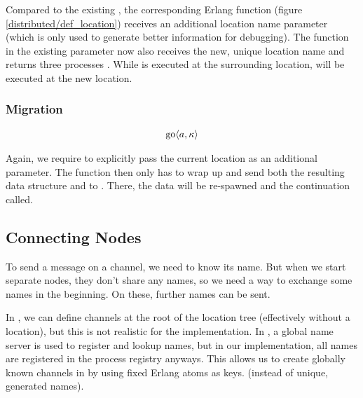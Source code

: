 Compared to the existing ,
the corresponding Erlang function 
(figure \ref{distributed/def_location})
receives an additional location name parameter
(which is only used to generate better information for debugging).
The function in the existing parameter now also receives the new,
unique location name and returns three processes .
While  is executed at the surrounding location,
 will be executed at the new location.



\subsubsection{Migration}

\begin{align*}
  \operatorname{go} \langle a, \kappa \rangle
\end{align*}

Again, we require to explicitly pass the current location
as an additional parameter.
The function 
then only has to wrap up  and send both
the resulting data structure and 
to .
There, the data will be re-spawned and the continuation called.



\subsection{Connecting Nodes}

To send a message on a channel, we need to know its name.
But when we start separate nodes, they don't share any names,
so we need a way to exchange some names in the beginning.
On these, further names can be sent.

In \distjoincalc, we can define channels at the root of the location tree
(effectively without a location), but this is not realistic for the
implementation.
In \cite{fournet_jocaml:_2002},
a global name server is used to register and lookup names,
but in our implementation,
all names are registered in the process registry anyways.
This allows us to create globally known channels
in  by using fixed Erlang atoms as keys.
(instead of unique, generated names).


